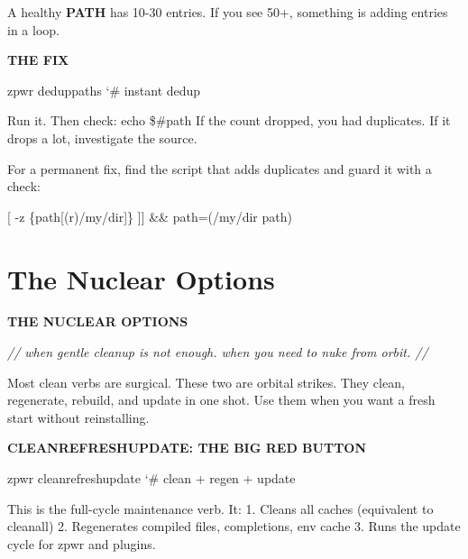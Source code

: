 \documentclass[11pt,a4paper,twoside]{book}
\begin{document}
A healthy \textbf{PATH} has 10-30 entries. If you see 50+, something is adding entries in a loop.


\vspace{12pt}
{\bfseries\color{neonyellow} THE FIX}\vspace{4pt}

\begin{codebox}
\color{neongreen}zpwr deduppaths                     {\char`\#} instant dedup\\
\end{codebox}

Run it. Then check: echo \$\#path If the count dropped, you had duplicates. If it drops a lot, investigate the source.

For a permanent fix, find the script that adds duplicates and guard it with a check:

\begin{codebox}
\color{neongreen}{[}[ -z \{path[(r)/my/dir]\} ]] \&\& path=(/my/dir path)\\
\end{codebox}


\vspace{16pt}

\section{The Nuclear Options}


\vspace{10pt}
{\large\bfseries\color{neoncyan} THE NUCLEAR OPTIONS}\vspace{6pt}

{\small\itshape\color{dimtext} // when gentle cleanup is not enough. when you need to nuke from orbit. //}

Most clean verbs are surgical. These two are orbital strikes. They clean, regenerate, rebuild, and update in one shot. Use them when you want a fresh start without reinstalling.


\vspace{12pt}
{\bfseries\color{neonyellow} CLEANREFRESHUPDATE: THE BIG RED BUTTON}\vspace{4pt}

\begin{codebox}
\color{neongreen}zpwr cleanrefreshupdate             {\char`\#} clean + regen + update\\
\end{codebox}

This is the full-cycle maintenance verb. It: 1. Cleans all caches (equivalent to cleanall) 2. Regenerates compiled files, completions, env cache 3. Runs the update cycle for zpwr and plugins.
\end{document}
